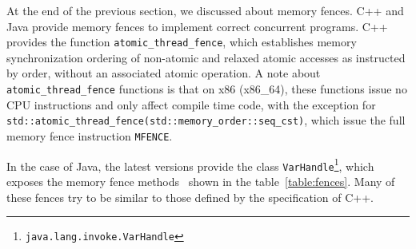 At the end of the previous section, we discussed about memory fences. C++ and Java provide memory fences to implement correct concurrent programs. C++ provides the function \texttt{atomic\_thread\_fence}, which establishes memory synchronization ordering of non-atomic and relaxed atomic accesses as instructed by order, without an associated atomic operation. A note about \texttt{atomic\_thread\_fence} functions is that on x86 (x86\_64), these functions issue no CPU instructions and only affect compile time code, with the exception for \texttt{std::atomic\_thread\_fence(std::memory\_order::seq\_cst)}, which issue the full memory fence instruction \texttt{MFENCE}.

In the case of Java, the latest versions provide the class \texttt{VarHandle}\footnote{\texttt{java.lang.invoke.VarHandle}}, which exposes the memory fence methods~\cite{varHandleJdk92017} shown in the table~\ref{table:fences}. Many of these fences try to be similar to those defined by the specification of C++.

